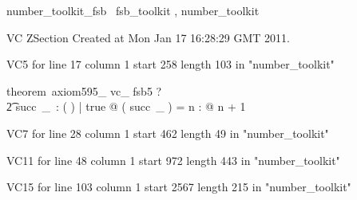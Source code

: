 \documentclass{article}
\begin{document}

\begin{zsection}
	 \SECTION number\_toolkit\_fsb \parents~fsb\_toolkit , number\_toolkit
\end{zsection}

VC ZSection Created at Mon Jan 17 16:28:29 GMT 2011.

VC5 for line 17 column 1 start 258 length 103 in "number_toolkit"
\begin{zed}
theorem~axiom595\_ vc\_ fsb5 \vdash ? \\
   \t2 \exists succ~\_~: \power ( \nat \cross \nat ) | true @ ( succ~\_ ) = \lambda n : \nat @ n + 1
\end{zed}

VC7 for line 28 column 1 start 462 length 49 in "number_toolkit"

VC11 for line 48 column 1 start 972 length 443 in "number_toolkit"

VC15 for line 103 column 1 start 2567 length 215 in "number_toolkit"
\end{document}
